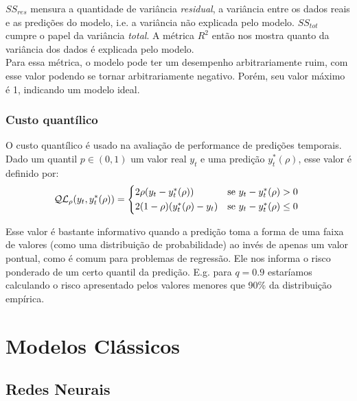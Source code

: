 $SS_{res}$ mensura a quantidade de variância \textit{residual}, a
variância entre os dados reais e as predições do modelo, i.e. a variância não
explicada pelo modelo. $SS_{tot}$ cumpre o papel da variância \textit{total}. A métrica $R^2$
então nos mostra quanto da variância dos dados é explicada pelo modelo. \\

Para essa métrica, o modelo pode ter um desempenho arbitrariamente ruim, com esse valor
podendo se tornar arbitrariamente negativo. Porém, seu valor máximo é 1,
indicando um modelo ideal.\\


\subsubsection{Custo quantílico}

O custo quantílico \citep{deepar} é usado na avaliação de performance de predições temporais. \\
Dado um quantil $p \in (0,1)$ um valor real $y_{t}$ e uma predição $y^{*}_{t}(\rho)$, esse valor é definido por: \\

\begin{equation}
  \mathcal{QL}_{\rho}(y_{t},y^{*}_{t}(\rho)) =
\begin{cases*}
  2 \rho(y_{t} - y^{*}_{t}(\rho)) & se $ y_{t} - y^{*}_{t}(\rho) > 0$ \\
  2 (1 - \rho)(y^{*}_{t}(\rho) - y_{t}) & se $y_{t} - y^{*}_{t}(\rho) \leq 0$
\end{cases*}
\end{equation}


Esse valor é bastante informativo quando a predição toma a forma de uma faixa de
valores (como uma distribuição de probabilidade) ao invés de apenas um valor
pontual, como é comum para problemas de regressão. Ele nos informa o risco
ponderado de um certo quantil da predição. E.g. para $q = 0.9$ estaríamos
calculando o risco apresentado pelos valores menores que 90\% da distribuição empírica. 



\section{Modelos Clássicos} 


\subsection{Redes Neurais}

